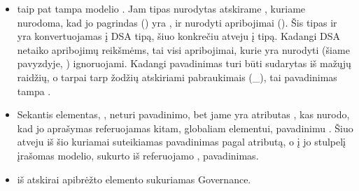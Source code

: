 \documentclass[letterpaper,10pt,lithuanian]{sphinxmanual}
\begin{document}
\begin{itemize}
\item {} 
\sphinxAtStartPar
{}  taip pat tampa  modelio {\hyperref[\detokenize{formatas:property}]{}}. Jam tipas nurodytas
atskirame {\hyperref[\detokenize{schemos/xsd:xsd-simpletype}]{}}, kuriame nurodoma, kad jo pagrindas () yra ,
ir nurodyti apribojimai (). Šis  tipas ir yra konvertuojamas į DSA tipą,
šiuo konkrečiu atveju \sphinxhyphen{} į  tipą. Kadangi DSA netaiko apribojimų reikšmėms, tai visi apribojimai,
kurie yra nurodyti  (šiame pavyzdyje, ) ignoruojami. Kadangi {\hyperref[\detokenize{formatas:property}]{}}
pavadinimas turi būti sudarytas iš mažųjų raidžių, o tarpai tarp žodžių atskiriami pabraukimais (\_), tai
{\hyperref[\detokenize{formatas:property}]{}} pavadinimas tampa .

\item {} 
\sphinxAtStartPar
Sekantis elementas, , neturi pavadinimo, bet jame yra atributas ,
kas nurodo, kad jo aprašymas referuojamas kitam, globaliam elementui, pavadinimu .
Šiuo atveju iš šio  kuriamai {\hyperref[\detokenize{formatas:property}]{}} suteikiamas pavadinimas pagal
 atributą, o į jo  stulpelį įrašomas modelio, sukurto iš referuojamo , pavadinimas.

\item {} 
\sphinxAtStartPar
iš atskirai apibrėžto elemento  sukuriamas {\hyperref[\detokenize{formatas:model}]{}} Governance.

\end{itemize}
\end{document}
